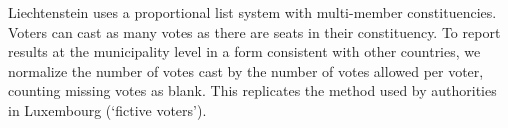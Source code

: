 Liechtenstein uses a proportional list system with multi-member constituencies.
Voters can cast as many votes as there are seats in their constituency.
To report results at the municipality level in a form consistent with other countries, 
we normalize the number of votes cast by the number of votes allowed per voter, counting
missing votes as blank. This replicates the method used by authorities
in Luxembourg (`fictive voters').